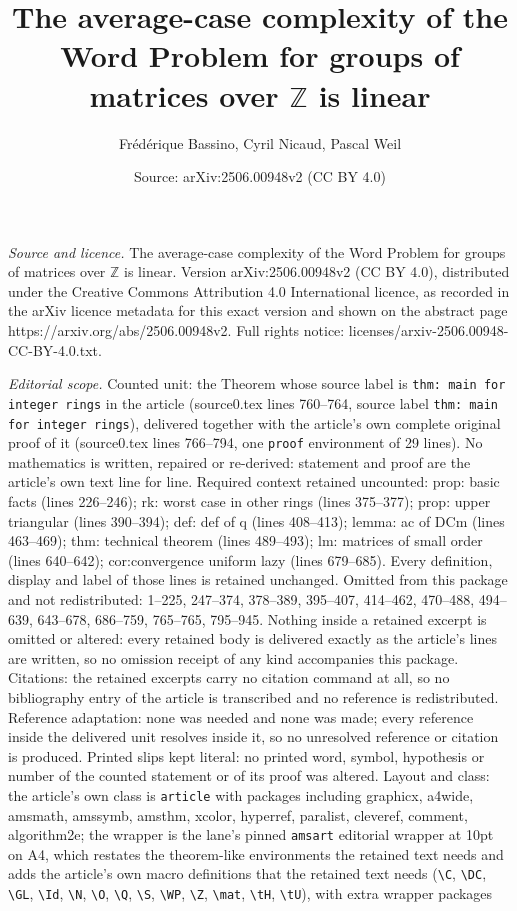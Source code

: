 \documentclass[10pt,a4paper]{amsart}
\title[The average-case complexity of the Word Problem for groups o]{The average-case complexity of the Word Problem for groups of matrices over $\mathbb{Z}$ is linear}
\author{Fr\'ed\'erique Bassino, Cyril Nicaud, Pascal Weil}
\date{Source: arXiv:2506.00948v2 (CC BY 4.0)}
\begin{document}
\maketitle

\noindent\emph{Source and licence.} The average-case complexity of the Word Problem for groups of matrices over $\mathbb{Z}$ is linear. Version arXiv:2506.00948v2 (CC BY 4.0), distributed under the Creative Commons Attribution 4.0 International licence, as recorded in the arXiv licence metadata for this exact version and shown on the abstract page https://arxiv.org/abs/2506.00948v2. Full rights notice: licenses/arxiv-2506.00948-CC-BY-4.0.txt.\par\smallskip

\noindent\textit{Editorial scope.} Counted unit: the Theorem whose source label is \texttt{thm: main for integer rings} in the article (source0.tex lines 760--764, source label \texttt{thm: main for integer rings}), delivered together with the article's own complete original proof of it (source0.tex lines 766--794, one \texttt{proof} environment of 29 lines). No mathematics is written, repaired or re-derived: statement and proof are the article's own text line for line. Required context retained uncounted: prop: basic facts (lines 226--246); rk: worst case in other rings (lines 375--377); prop: upper triangular (lines 390--394); def: def of q (lines 408--413); lemma: ac of DCm (lines 463--469); thm: technical theorem (lines 489--493); lm: matrices of small order (lines 640--642); cor:convergence uniform lazy (lines 679--685). Every definition, display and label of those lines is retained unchanged. Omitted from this package and not redistributed: 1--225, 247--374, 378--389, 395--407, 414--462, 470--488, 494--639, 643--678, 686--759, 765--765, 795--945. Nothing inside a retained excerpt is omitted or altered: every retained body is delivered exactly as the article's lines are written, so no omission receipt of any kind accompanies this package. Citations: the retained excerpts carry no citation command at all, so no bibliography entry of the article is transcribed and no reference is redistributed. Reference adaptation: none was needed and none was made; every reference inside the delivered unit resolves inside it, so no unresolved reference or citation is produced. Printed slips kept literal: no printed word, symbol, hypothesis or number of the counted statement or of its proof was altered. Layout and class: the article's own class is \texttt{article} with packages including graphicx, a4wide, amsmath, amssymb, amsthm, xcolor, hyperref, paralist, cleveref, comment, algorithm2e; the wrapper is the lane's pinned \texttt{amsart} editorial wrapper at 10pt on A4, which restates the theorem-like environments the retained text needs and adds the article's own macro definitions that the retained text needs (\texttt{\textbackslash C}, \texttt{\textbackslash DC}, \texttt{\textbackslash GL}, \texttt{\textbackslash Id}, \texttt{\textbackslash N}, \texttt{\textbackslash O}, \texttt{\textbackslash Q}, \texttt{\textbackslash S}, \texttt{\textbackslash WP}, \texttt{\textbackslash Z}, \texttt{\textbackslash mat}, \texttt{\textbackslash tH}, \texttt{\textbackslash tU}), with extra wrapper packages 
\end{document}
